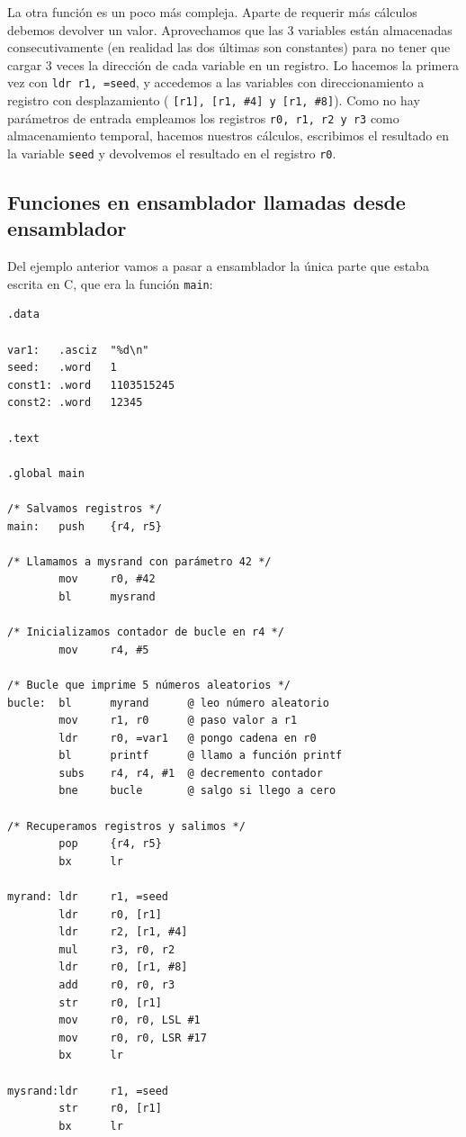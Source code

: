 La otra función es un poco más compleja. Aparte de requerir más cálculos debemos
devolver un valor. Aprovechamos que las 3 variables están almacenadas
consecutivamente (en realidad las dos últimas son constantes) para no tener que
cargar 3 veces la dirección de cada
variable en un registro. Lo hacemos la primera vez con {\tt ldr r1, =seed}, y
accedemos a las variables con direccionamiento a registro con desplazamiento (
{\tt [r1], [r1, \#4] y [r1, \#8]}). Como no hay parámetros de entrada empleamos
los registros {\tt r0, r1, r2 y r3} como almacenamiento temporal, hacemos nuestros
cálculos, escribimos el resultado en la variable {\tt seed} y devolvemos el
resultado en el registro {\tt r0}.

\subsection{Funciones en ensamblador llamadas desde ensamblador}

Del ejemplo anterior vamos a pasar a ensamblador la única parte que estaba escrita en
C, que era la función {\tt main}:

\begin{lstlisting}[caption={Código del programa subrut2.s},label={lst:codigoPract3_3}]
.data

var1:   .asciz  "%d\n"
seed:   .word   1
const1: .word   1103515245
const2: .word   12345

.text

.global main

/* Salvamos registros */
main:   push    {r4, r5}

/* Llamamos a mysrand con parámetro 42 */
        mov     r0, #42
        bl      mysrand

/* Inicializamos contador de bucle en r4 */
        mov     r4, #5

/* Bucle que imprime 5 números aleatorios */
bucle:  bl      myrand      @ leo número aleatorio
        mov     r1, r0      @ paso valor a r1
        ldr     r0, =var1   @ pongo cadena en r0
        bl      printf      @ llamo a función printf
        subs    r4, r4, #1  @ decremento contador
        bne     bucle       @ salgo si llego a cero

/* Recuperamos registros y salimos */
        pop     {r4, r5}
        bx      lr

myrand: ldr     r1, =seed
        ldr     r0, [r1]
        ldr     r2, [r1, #4]
        mul     r3, r0, r2
        ldr     r0, [r1, #8]
        add     r0, r0, r3
        str     r0, [r1]
        mov     r0, r0, LSL #1
        mov     r0, r0, LSR #17
        bx      lr

mysrand:ldr     r1, =seed
        str     r0, [r1]
        bx      lr
\end{lstlisting}

